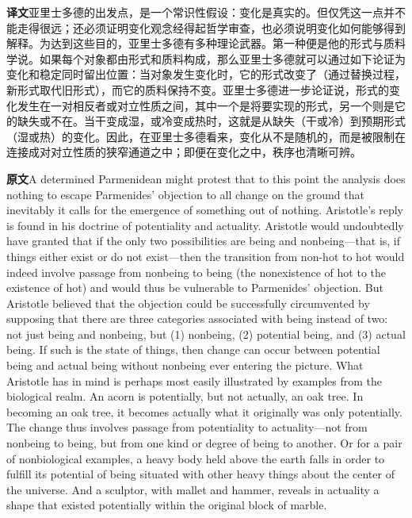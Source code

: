 \documentclass[UTF8,zihao=-4]{ctexart}
\newcommand{\BodyFont}{\fontsize{10.5pt}{15.5pt}\selectfont}
\newcommand{\origlabel}{\textbf{原文}\quad}
\newcommand{\translabel}{\textbf{译文}\quad}
\newcommand{\orig}{\par\noindent\begingroup\BodyFont\origlabel}
\newcommand{\zhline}[1]{\par\endgroup\noindent\begingroup\BodyFont\translabel #1\par\endgroup\vspace{0.35em}}
\begin{document}
\zhline{亚里士多德的出发点，是一个常识性假设：变化是真实的。但仅凭这一点并不能走得很远；还必须证明变化观念经得起哲学审查，也必须说明变化如何能够得到解释。为达到这些目的，亚里士多德有多种理论武器。第一种便是他的形式与质料学说。如果每个对象都由形式和质料构成，那么亚里士多德就可以通过如下论证为变化和稳定同时留出位置：当对象发生变化时，它的形式改变了（通过替换过程，新形式取代旧形式），而它的质料保持不变。亚里士多德进一步论证说，形式的变化发生在一对相反者或对立性质之间，其中一个是将要实现的形式，另一个则是它的缺失或不在。当干变成湿，或冷变成热时，这就是从缺失（干或冷）到预期形式（湿或热）的变化。因此，在亚里士多德看来，变化从不是随机的，而是被限制在连接成对对立性质的狭窄通道之中；即便在变化之中，秩序也清晰可辨。}

\orig A determined Parmenidean might protest that to this point the analysis does nothing to escape Parmenides' objection to all change on the ground that inevitably it calls for the emergence of something out of nothing. Aristotle's reply is found in his doctrine of potentiality and actuality. Aristotle would undoubtedly have granted that if the only two possibilities are being and nonbeing---that is, if things either exist or do not exist---then the transition from non-hot to hot would indeed involve passage from nonbeing to being (the nonexistence of hot to the existence of hot) and would thus be vulnerable to Parmenides' objection. But Aristotle believed that the objection could be successfully circumvented by supposing that there are three categories associated with being instead of two: not just being and nonbeing, but (1) nonbeing, (2) potential being, and (3) actual being. If such is the state of things, then change can occur between potential being and actual being without nonbeing ever entering the picture. What Aristotle has in mind is perhaps most easily illustrated by examples from the biological realm. An acorn is potentially, but not actually, an oak tree. In becoming an oak tree, it becomes actually what it originally was only potentially. The change thus involves passage from potentiality to actuality---not from nonbeing to being, but from one kind or degree of being to another. Or for a pair of nonbiological examples, a heavy body held above the earth falls in order to fulfill its potential of being situated with other heavy things about the center of the universe. And a sculptor, with mallet and hammer, reveals in actuality a shape that existed potentially within the original block of marble.
\end{document}

